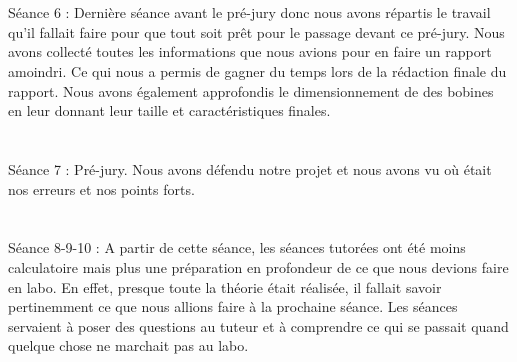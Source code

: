 \documentclass{report}
\begin{document}
\section{}
Séance 6 : Dernière séance avant le pré-jury donc nous avons répartis le travail qu’il fallait faire pour que tout soit prêt pour le passage devant ce pré-jury.  Nous avons collecté toutes les informations que nous avions pour en faire un rapport amoindri.   Ce qui nous a permis de gagner du temps lors de la rédaction finale du rapport.  Nous avons également approfondis le dimensionnement de des bobines en leur donnant leur taille et caractéristiques finales.  

\section{}
Séance 7 : Pré-jury.  Nous avons défendu notre projet et nous avons vu où était nos erreurs et nos points forts.  

\section{}
Séance 8-9-10 : A partir de cette séance, les séances tutorées ont été moins calculatoire mais plus une préparation en profondeur de ce que nous devions faire en labo.  En effet, presque toute la théorie était réalisée, il fallait savoir pertinemment ce que nous allions faire à la prochaine séance.   Les séances servaient à poser des questions au tuteur et à comprendre ce qui se passait quand quelque chose ne marchait pas au labo.
\end{document}
